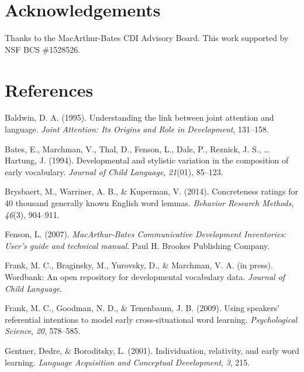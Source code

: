 \documentclass[10pt, letterpaper]{article}
\begin{document}
\vspace{1em}


\section{Acknowledgements}\label{acknowledgements}

Thanks to the MacArthur-Bates CDI Advisory Board. This work supported by
NSF BCS \#1528526.

\section{References}\label{references}

\setlength{\parindent}{-0.1in} \setlength{\leftskip}{0.125in} \noindent

Baldwin, D. A. (1995). Understanding the link between joint attention
and language. \emph{Joint Attention: Its Origins and Role in
Development}, 131--158.

Bates, E., Marchman, V., Thal, D., Fenson, L., Dale, P., Reznick, J. S.,
\ldots{} Hartung, J. (1994). Developmental and stylistic variation in
the composition of early vocabulary. \emph{Journal of Child Language},
\emph{21}(01), 85--123.

Brysbaert, M., Warriner, A. B., \& Kuperman, V. (2014). Concreteness
ratings for 40 thousand generally known English word lemmas.
\emph{Behavior Research Methods}, \emph{46}(3), 904--911.

Fenson, L. (2007). \emph{MacArthur-Bates Communicative Development
Inventories: User's guide and technical manual}. Paul H. Brookes
Publishing Company.

Frank, M. C., Braginsky, M., Yurovsky, D., \& Marchman, V. A. (in
press). Wordbank: An open repository for developmental vocabulary data.
\emph{Journal of Child Language}.

Frank, M. C., Goodman, N. D., \& Tenenbaum, J. B. (2009). Using
speakers' referential intentions to model early cross-situational word
learning. \emph{Psychological Science}, \emph{20}, 578--585.

Gentner, Dedre, \& Boroditsky, L. (2001). Individuation, relativity, and
early word learning. \emph{Language Acquisition and Conceptual
Development}, \emph{3}, 215.
\end{document}
